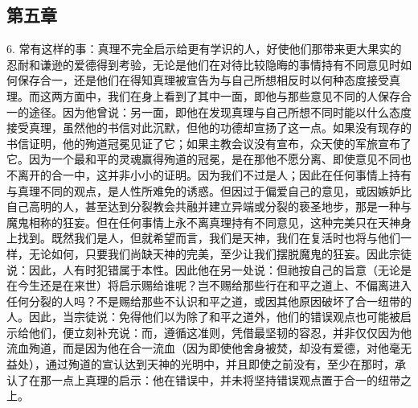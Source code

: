 
\subsection{第五章}

6. 常有这样的事：真理不完全启示给更有学识的人，好使他们那带来更大果实的忍耐和谦逊的爱德得到考验，无论是他们在对待比较隐晦的事情持有不同意见时如何保存合一，还是他们在得知真理被宣告为与自己所想相反时以何种态度接受真理。而这两方面中，我们在身上看到了其中一面，即他与那些意见不同的人保存合一的途径。因为他曾说：另一面，即他在发现真理与自己所想不同时能以什么态度接受真理，虽然他的书信对此沉默，但他的功德却宣扬了这一点。如果没有现存的书信证明，他的殉道冠冕见证了它；如果主教会议没有宣布，众天使的军旅宣布了它。因为一个最和平的灵魂赢得殉道的冠冕，是在那他不愿分离、即使意见不同也不离开的合一中，这并非小小的证明。因为我们不过是人；因此在任何事情上持有与真理不同的观点，是人性所难免的诱惑。但因过于偏爱自己的意见，或因嫉妒比自己高明的人，甚至达到分裂教会共融并建立异端或分裂的亵圣地步，那是一种与魔鬼相称的狂妄。但在任何事情上永不离真理持有不同意见，这种完美只在天神身上找到。既然我们是人，但就希望而言，我们是天神，我们在复活时也将与他们一样，无论如何，只要我们尚缺天神的完美，至少让我们摆脱魔鬼的狂妄。因此宗徒说：因此，人有时犯错属于本性。因此他在另一处说：但祂按自己的旨意（无论是在今生还是在来世）将启示赐给谁呢？岂不赐给那些行在和平之道上、不偏离进入任何分裂的人吗？不是赐给那些不认识和平之道，或因其他原因破坏了合一纽带的人。因此，当宗徒说：免得他们以为除了和平之道外，他们的错误观点也可能被启示给他们，便立刻补充说：而，遵循这准则，凭借最坚韧的容忍，并非仅仅因为他流血殉道，而是因为他在合一流血（因为即使他舍身被焚，却没有爱德，对他毫无益处），通过殉道的宣认达到天神的光明中，并且即使之前没有，至少在那时，承认了在那一点上真理的启示：他在错误中，并未将坚持错误观点置于合一的纽带之上。\par



